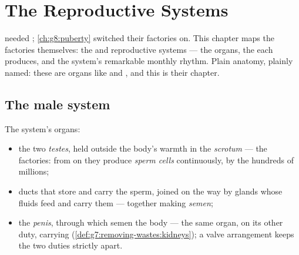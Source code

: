 \chapter{The Reproductive Systems}\label{ch:g8:reproductive-systems}

 needed ;
\cref{ch:g8:puberty} switched their factories on. This
chapter maps the factories themselves: the  and 
reproductive systems --- the organs, the  each
produces, and the  system's remarkable monthly
rhythm. Plain anatomy, plainly named: these are organs like
 and , and this is their chapter.

\section{The male system}

\begin{definition}\label{def:g8:reproductive-systems:male}
The  system's organs:
\begin{itemize}
  \item the two \emph{testes}, held outside
        the body's warmth in the \emph{scrotum} --- the
         factories: from  on they produce
        \emph{sperm cells} continuously,
        by the hundreds of millions;
  \item ducts that store and carry the sperm, joined on
        the way by glands whose fluids feed and carry
        them --- together making \emph{semen};
  \item the \emph{penis}, through which semen
         the body --- the same organ, on its other
        duty, carrying 
        (\cref{def:g7:removing-wastes:kidneys}); a valve
        arrangement keeps the two duties strictly apart.
\end{itemize}
\end{definition}

